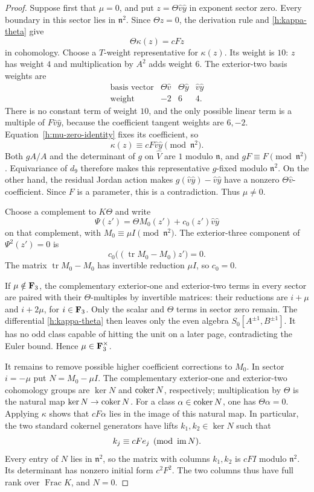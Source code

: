 \begin{proof}
Suppose first that $\mu=0$, and put
$z=\Theta\hat v\hat y$ in exponent sector zero. Every boundary in
this sector lies in $\mathfrak n^2$. Since $\Theta z=0$, the
derivation rule and \eqref{h:kappa-theta} give
\begin{equation}
 \label{h:mu-zero-identity}
 \Theta\kappa(z)=cFz
\end{equation}
in cohomology. Choose a $T$-weight representative for $\kappa(z)$.
Its weight is $10$: $z$ has weight $4$ and multiplication by $A^2$
adds weight $6$. The exterior-two basis weights are
\[
 \begin{array}{c|ccc}
  \text{basis vector}&\Theta\hat v&\Theta\hat y&\hat v\hat y\\
  \text{weight}&-2&6&4.
 \end{array}
\]
There is no constant term of weight $10$, and the only possible linear
term is a multiple of $F\hat v\hat y$, because the coefficient tangent
weights are $6,-2$. Equation~\eqref{h:mu-zero-identity} fixes its
coefficient, so
\[
 \kappa(z)\equiv cF\hat v\hat y\pmod{\mathfrak n^2}.
\]
Both $gA/A$ and the determinant of $g$ on $\widehat V$ are $1$ modulo
$\mathfrak n$, and $gF\equiv F\pmod{\mathfrak n^2}$.
Equivariance of $d_9$ therefore makes this representative $g$-fixed
modulo $\mathfrak n^2$. On the other hand, the residual Jordan action
makes $g(\hat v\hat y)-\hat v\hat y$ have a nonzero
$\Theta\hat v$-coefficient. Since $F$ is a parameter, this is a
contradiction. Thus $\mu\ne0$.

Choose a complement to $K\Theta$ and write
\[
 \Psi(z')=\Theta M_0(z')+c_0(z')\hat v\hat y
\]
on that complement, with $M_0\equiv\mu I\pmod{\mathfrak n^2}$.
The exterior-three component of $\Psi^2(z')=0$ is
\[
 c_0\bigl((\operatorname{tr}M_0-M_0)z'\bigr)=0.
\]
The matrix $\operatorname{tr}M_0-M_0$ has invertible reduction
$\mu I$, so $c_0=0$.

If $\mu\notin\mathbf F_3$, the complementary exterior-one and
exterior-two terms in every sector are paired with their
$\Theta$-multiples by invertible matrices: their reductions are
$i+\mu$ and $i+2\mu$, for $i\in\mathbf F_3$. Only the scalar and
$\Theta$ terms in sector zero remain. The differential
\eqref{h:kappa-theta} then leaves only the even algebra
$S_0[A^{\pm1},B^{\pm1}]$. It has no odd class capable of hitting the
unit on a later page, contradicting the Euler bound. Hence
$\mu\in\mathbf F_3^{\times}$.

It remains to remove possible higher coefficient corrections to $M_0$.
In sector $i=-\mu$ put $N=M_0-\mu I$. The complementary
exterior-one and exterior-two cohomology groups are
$\ker N$ and $\operatorname{coker} N$, respectively; multiplication by $\Theta$
is the natural map $\ker N\to\operatorname{coker} N$. For a class
$\alpha\in\operatorname{coker} N$, one has $\Theta\alpha=0$. Applying
$\kappa$ shows that $cF\alpha$ lies in the image of this natural
map. In particular, the two standard cokernel generators have lifts
$k_1,k_2\in\ker N$ such that
\[
 k_j\equiv cF e_j\pmod{\operatorname{im} N}.
\]
Every entry of $N$ lies in $\mathfrak n^2$, so the matrix with columns
$k_1,k_2$ is $cF I$ modulo $\mathfrak n^2$. Its determinant has
nonzero initial form $c^2F^2$. The two columns thus have full rank
over $\operatorname{Frac}K$, and $N=0$.


\end{proof}
